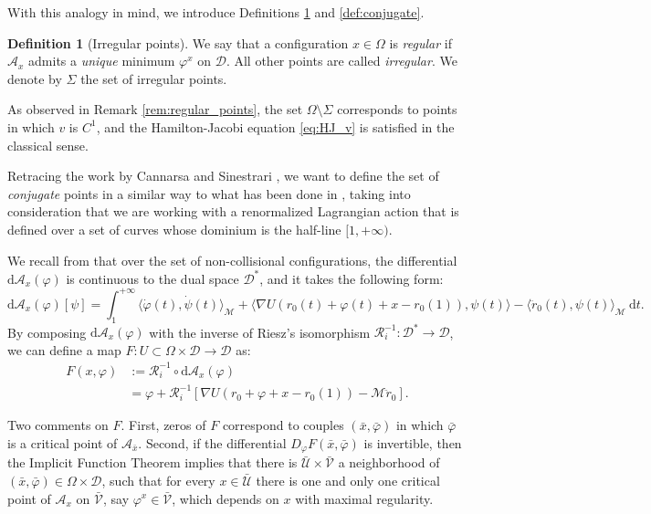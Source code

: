 \documentclass[a4paper,10pt]{amsart}
\newcommand{\ud}{\mathrm{d}}
\theoremstyle{plain}
\theoremstyle{definition}
\newtheorem{defn}[thm]{Definition}
\numberwithin{equation}{section}
\numberwithin{thm}{section}
\begin{document}
With this analogy in mind, we introduce Definitions \ref{def:irregular} and \ref{def:conjugate}.

\begin{defn}[Irregular points]\label{def:irregular}
    We say that a configuration $x\in\Omega$ is \emph{regular} if $\mathcal{A}_x$ admits a \emph{unique} minimum $\varphi^x$ on $\mathcal{D}$. All other points are called \emph{irregular}. We denote by $\Sigma$ the set of irregular points.
\end{defn}
As observed in Remark \ref{rem:regular_points}, the set $\Omega \setminus \Sigma$ corresponds to points in which $v$ is $C^1$, and the Hamilton-Jacobi equation \eqref{eq:HJ_v} is satisfied in the classical sense.

\medskip
Retracing the work by Cannarsa and Sinestrari \cite{MR2041617}, we want to define the set of \emph{conjugate} points in a similar way to what has been done in \cite{MR2041617}, taking into consideration that we are working with a renormalized Lagrangian action that is defined over a set of curves whose dominium is the half-line $[1,+\infty)$. 

We recall from \cite{PolimeniTerracini} that over the set of non-collisional configurations, the differential $\ud\mathcal{A}_x(\varphi)$ is continuous to the dual space $\mathcal{D}^*$, and it takes the following form:
\begin{equation}
    \label{eq:diffA}
    \ud \mathcal{A}_x(\varphi)[\psi] 
    = \int_{1}^{+\infty} \langle \dot{\varphi}(t),\dot{\psi}(t)\rangle_\mathcal{M} + \langle \nabla U(r_0(t)+\varphi(t)+x-r_0(1)),\psi(t)\rangle - \langle\ddot{r}_0(t),\psi(t)\rangle_\mathcal{M}\ \ud t.
\end{equation}
By composing $\ud \mathcal{A}_x(\varphi)$ with the inverse of Riesz's isomorphism $\mathcal{R}_i^{-1}:\mathcal{D}^* \to \mathcal{D}$, we can define a map $F:U\subset \Omega\times \mathcal{D} \to \mathcal{D}$
as:
\[
\begin{split}
F(x,\varphi)&:=\mathcal{R}_i^{-1}\circ\ud\mathcal{A}_x(\varphi)
\\
&= \varphi+ \mathcal{R}_i^{-1}[\nabla U(r_0 + \varphi + x - r_0(1)) - \mathcal{M}\ddot{r}_0].
\end{split}
\]

Two comments on $F$. First, zeros of $F$ correspond to couples $(\bar x,\bar \varphi)$ in which $\bar\varphi$ is a critical point of $\mathcal{A}_{\bar x}$. Second, if the differential $D_{\varphi}F(\bar x,\bar\varphi)$ is invertible, then the Implicit Function Theorem implies that there is $\mathcal{\bar U}\times \mathcal{\bar V}$ a neighborhood of $(\bar x, \bar\varphi) \in \Omega \times \mathcal{D}$, such that for every $x \in \mathcal{\bar U}$ there is one and only one critical point of $\mathcal{A}_x$ on $\mathcal{\bar V}$, say $\varphi^{x}\in\mathcal{\bar V}$, which depends on $x$ with maximal regularity. 
\end{document}
